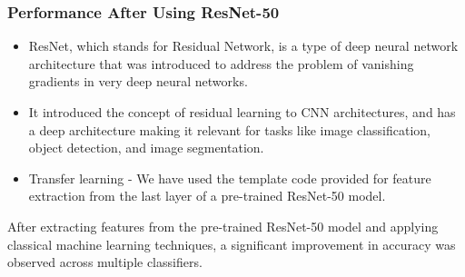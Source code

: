 \documentclass[a4paper]{article}
\theoremstyle{plain}
\theoremstyle{definition}
\begin{document}
\begin{enumerate}
\vspace{0.5cm}

\subsubsection{Performance After Using ResNet-50 }
\begin{itemize}
    \item ResNet, which stands for Residual Network, is a type of deep neural network architecture that was introduced to address the problem of vanishing gradients in very deep neural networks. 
    \item It introduced the concept of residual learning to CNN architectures, and has a deep architecture making it relevant for tasks like image classification, object detection, and image segmentation.
    \item Transfer learning - We have used the template code provided for feature extraction from the last layer of a pre-trained ResNet-50 model.
\end{itemize}
After extracting features from the pre-trained ResNet-50 model and applying classical machine learning techniques, a significant improvement in accuracy was observed across multiple classifiers.\\

\begin{table}[h!]
\centering
\caption{Performance metrics measures after ResNet-50 -}
\label{my-label}
\end{table}


\end{enumerate}
\end{document}

